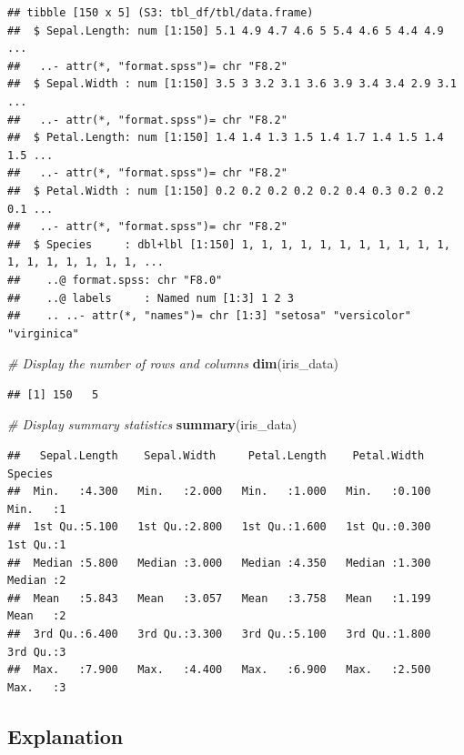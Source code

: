 \documentclass[
]{article}
\newenvironment{Shaded}{\begin{snugshade}}{\end{snugshade}}
\newcommand{\CommentTok}[1]{\textcolor[rgb]{0.56,0.35,0.01}{\textit{#1}}}
\newcommand{\FunctionTok}[1]{\textcolor[rgb]{0.13,0.29,0.53}{\textbf{#1}}}
\newcommand{\NormalTok}[1]{#1}
\begin{document}
\begin{verbatim}
## tibble [150 x 5] (S3: tbl_df/tbl/data.frame)
##  $ Sepal.Length: num [1:150] 5.1 4.9 4.7 4.6 5 5.4 4.6 5 4.4 4.9 ...
##   ..- attr(*, "format.spss")= chr "F8.2"
##  $ Sepal.Width : num [1:150] 3.5 3 3.2 3.1 3.6 3.9 3.4 3.4 2.9 3.1 ...
##   ..- attr(*, "format.spss")= chr "F8.2"
##  $ Petal.Length: num [1:150] 1.4 1.4 1.3 1.5 1.4 1.7 1.4 1.5 1.4 1.5 ...
##   ..- attr(*, "format.spss")= chr "F8.2"
##  $ Petal.Width : num [1:150] 0.2 0.2 0.2 0.2 0.2 0.4 0.3 0.2 0.2 0.1 ...
##   ..- attr(*, "format.spss")= chr "F8.2"
##  $ Species     : dbl+lbl [1:150] 1, 1, 1, 1, 1, 1, 1, 1, 1, 1, 1, 1, 1, 1, 1, 1, 1, 1, ...
##    ..@ format.spss: chr "F8.0"
##    ..@ labels     : Named num [1:3] 1 2 3
##    .. ..- attr(*, "names")= chr [1:3] "setosa" "versicolor" "virginica"
\end{verbatim}

\begin{Shaded}
\begin{Highlighting}[]
\CommentTok{\# Display the number of rows and columns}
\FunctionTok{dim}\NormalTok{(iris\_data)}
\end{Highlighting}
\end{Shaded}

\begin{verbatim}
## [1] 150   5
\end{verbatim}

\begin{Shaded}
\begin{Highlighting}[]
\CommentTok{\# Display summary statistics}
\FunctionTok{summary}\NormalTok{(iris\_data)}
\end{Highlighting}
\end{Shaded}

\begin{verbatim}
##   Sepal.Length    Sepal.Width     Petal.Length    Petal.Width       Species 
##  Min.   :4.300   Min.   :2.000   Min.   :1.000   Min.   :0.100   Min.   :1  
##  1st Qu.:5.100   1st Qu.:2.800   1st Qu.:1.600   1st Qu.:0.300   1st Qu.:1  
##  Median :5.800   Median :3.000   Median :4.350   Median :1.300   Median :2  
##  Mean   :5.843   Mean   :3.057   Mean   :3.758   Mean   :1.199   Mean   :2  
##  3rd Qu.:6.400   3rd Qu.:3.300   3rd Qu.:5.100   3rd Qu.:1.800   3rd Qu.:3  
##  Max.   :7.900   Max.   :4.400   Max.   :6.900   Max.   :2.500   Max.   :3
\end{verbatim}

\subsection{Explanation}\label{explanation}
\end{document}
